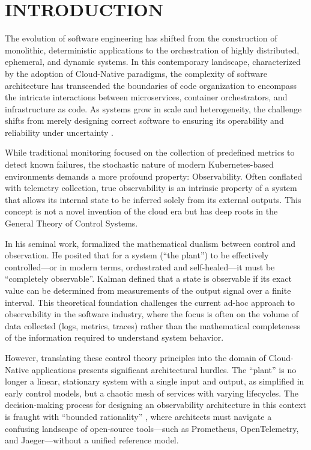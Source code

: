 \chapter{INTRODUCTION}
\label{chap:intro}

The evolution of software engineering has shifted from the construction of monolithic, deterministic applications to the orchestration of highly distributed, ephemeral, and dynamic systems. In this contemporary landscape, characterized by the adoption of Cloud-Native paradigms, the complexity of software architecture has transcended the boundaries of code organization to encompass the intricate interactions between microservices, container orchestrators, and infrastructure as code. As systems grow in scale and heterogeneity, the challenge shifts from merely designing correct software to ensuring its operability and reliability under uncertainty \cite{newman_2015, brewer_2000}.

While traditional monitoring focused on the collection of predefined metrics to detect known failures, the stochastic nature of modern Kubernetes-based environments demands a more profound property: Observability. Often conflated with telemetry collection, true observability is an intrinsic property of a system that allows its internal state to be inferred solely from its external outputs. This concept is not a novel invention of the cloud era but has deep roots in the General Theory of Control Systems.

In his seminal work,  formalized the mathematical dualism between control and observation. He posited that for a system (``the plant'') to be effectively controlled—or in modern terms, orchestrated and self-healed—it must be ``completely observable''. Kalman defined that a state is observable if its exact value can be determined from measurements of the output signal over a finite interval. This theoretical foundation challenges the current ad-hoc approach to observability in the software industry, where the focus is often on the volume of data collected (logs, metrics, traces) rather than the mathematical completeness of the information required to understand system behavior.

However, translating these control theory principles into the domain of Cloud-Native applications presents significant architectural hurdles. The ``plant'' is no longer a linear, stationary system with a single input and output, as simplified in early control models, but a chaotic mesh of services with varying lifecycles. The decision-making process for designing an observability architecture in this context is fraught with ``bounded rationality'' \cite{simon_1990}, where architects must navigate a confusing landscape of open-source tools—such as Prometheus, OpenTelemetry, and Jaeger—without a unified reference model.


